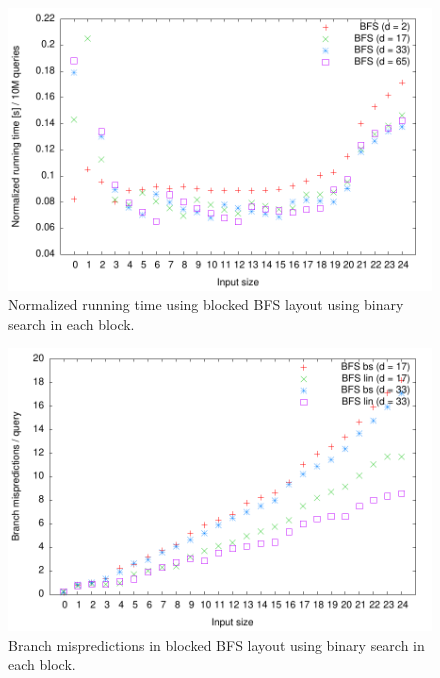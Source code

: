 \begin{figure}[h!]
  \label{fig:blocked_bfs_bs_runningtime}
  \centering
  \includegraphics[width=\textwidth]{../week1/plots/outputs/Btree_bs_runningtime}
  \caption{Normalized running time using blocked BFS layout using binary search in each block.}
\end{figure}

\begin{figure}[h!]
  \label{fig:blocked_bfs_branchmis_runningtime}
  \centering
  \includegraphics[width=\textwidth]{../week1/plots/outputs/Btree_branchmis}
  \caption{Branch mispredictions in blocked BFS layout using binary search in each block.}
\end{figure}

